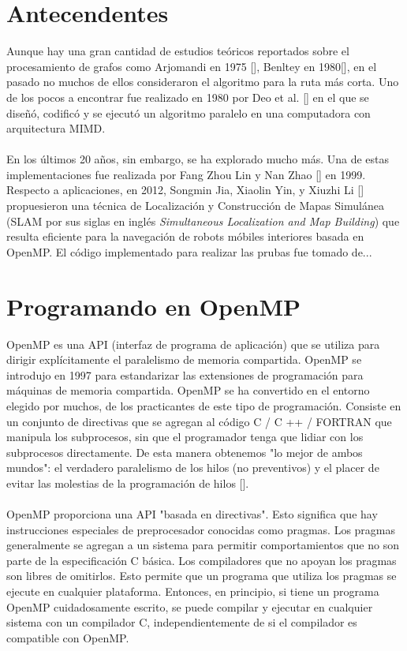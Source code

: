 \documentclass[11pt]{article}
\begin{document}
\section{Antecendentes}
Aunque hay una gran cantidad de estudios teóricos reportados sobre el procesamiento de grafos como Arjomandi en 1975 [], Benltey en 1980[], en el pasado no muchos de ellos consideraron el algoritmo para la ruta más corta. Uno de los pocos a encontrar fue realizado en 1980 por Deo et al. [] en el que se diseñó, codificó y se ejecutó un algoritmo paralelo en una computadora con arquitectura MIMD. 

\paragraph*{}
En los últimos 20 años, sin embargo, se ha explorado mucho más. Una de estas implementaciones fue realizada por Fang Zhou Lin y Nan Zhao [] en 1999. Respecto a aplicaciones, en 2012, Songmin Jia, Xiaolin Yin, y Xiuzhi Li [] propuesieron una técnica de Localización y Construcción de Mapas Simulánea (SLAM por sus siglas en inglés \textit {Simultaneous Localization and Map Building}) que resulta eficiente para la navegación de robots móbiles interiores basada en OpenMP. 
El código implementado para realizar las prubas fue tomado de...


\section{Programando en OpenMP}
OpenMP es una API (interfaz de programa de aplicación) que se utiliza para dirigir explícitamente el paralelismo de memoria compartida. OpenMP se introdujo en 1997 para estandarizar las extensiones de programación para máquinas de memoria compartida. OpenMP se ha convertido en el entorno elegido por muchos, de los practicantes de este tipo de programación. Consiste en un conjunto de directivas que se agregan al código C / C ++ / FORTRAN que manipula los subprocesos, sin que el programador tenga que lidiar con los subprocesos directamente. De esta manera obtenemos "lo mejor de ambos mundos": el verdadero paralelismo de los hilos (no preventivos) y el placer de evitar las molestias de la programación de hilos []. 

\paragraph{}
OpenMP proporciona una API "basada en directivas". Esto significa que hay instrucciones especiales de preprocesador conocidas como pragmas. Los pragmas generalmente se agregan a un sistema para permitir comportamientos que no son parte de la especificación C básica. Los compiladores que no apoyan los pragmas son libres de omitirlos. Esto permite que un programa que utiliza los pragmas se ejecute en cualquier plataforma. Entonces, en principio, si tiene un programa OpenMP cuidadosamente escrito, se puede compilar y ejecutar en cualquier sistema con un compilador C, independientemente de
si el compilador es compatible con OpenMP.
\end{document}
